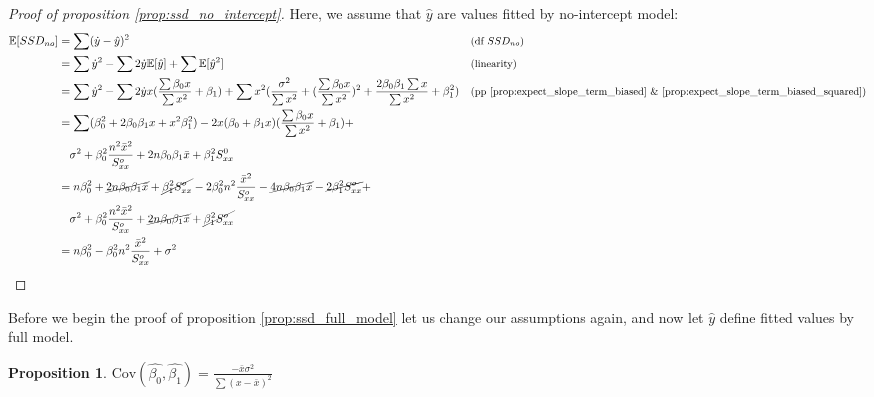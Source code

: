 \documentclass[12pt,a4paper,oneside]{book} %
\newtheorem{proposition}[theorem]{Proposition}
\newcommand{\E}{\mathbb{E}}
\newcommand{\Cov}{\mathrm{Cov}}
\begin{document}
\begin{proof}[Proof of proposition \ref{prop:ssd_no_intercept}]
Here, we assume that $\hat{y}$ are values fitted by no-intercept model:
\begin{align*}
	\E[SSD_{no}] &= \sum (\dot{y} - \hat{y})^2   && \text{\small{(df $SSD_{no}$)}}\\
	&=  \sum \dot{y}^2 - \sum 2 \dot{y} \E [\hat{y}] + \sum \E [\hat{y}^2] && \text{\small{(linearity)}} \\
	& = \sum \dot{y}^2 - \sum 2 \dot{y} x(\frac{\sum \beta_0 x }{\sum x^2} + \beta_1) + \sum x^2 ( \frac{\sigma^2}{\sum x^2}+(\frac{\sum \beta_0 x }{\sum x^2})^2 + \frac{2 \beta_0 \beta_1 \sum x}{\sum x^2} + \beta_1^2) && \text{\small{(pp \ref{prop:expect_slope_term_biased} \& \ref{prop:expect_slope_term_biased_squared})}}\\
	&= \sum (\beta_0^2 + 2 \beta_0 \beta_1 x + x^2 \beta_1^2) - 2x(\beta_0+\beta_1x)(\frac{\sum \beta_0 x }{\sum x^2} + \beta_1)+ \\
	& \quad \sigma^2+\beta_0^2\frac{n^2\bar{x}^2}{S_{xx}^o}+2n\beta_0\beta_1\bar{x}+\beta_1^2S_{xx}^0 \\
	&= n \beta_0^2 + \cancel{2n\beta_0\beta_1\bar{x}}+\cancel{\beta_1^2S_{xx}^o}-2\beta_0^2n^2\frac{\bar{x}^2}{S_{xx}^o}-\cancel{4n\beta_0\beta_1\bar{x}}-\cancel{2\beta_1^2S_{xx}^o}+ \\
	& \quad \sigma^2+\beta^2_0 \frac{n^2 \bar{x}^2}{S_{xx}^o}+\cancel{2n\beta_0\beta_1\bar{x}}+\cancel{\beta_1^2S_{xx}^o} \\
	&= n\beta_0^2-\beta_0^2 n^2 \frac{\bar{x}^2}{S_{xx}^o}+ \sigma^2
\end{align*}

\end{proof}
	
	
Before we begin the proof of proposition \ref{prop:ssd_full_model} let us change our assumptions again, and now let $\hat{y}$ define fitted values by full model.

\begin{proposition} \label{prop:covariance_slope_intercept}
	$\Cov (\hat{\beta_0},\hat{\beta_1})= \frac{-\bar{x} \sigma^2}{\sum (x-\bar{x})^2}$
\end{proposition}
	
\end{document}
